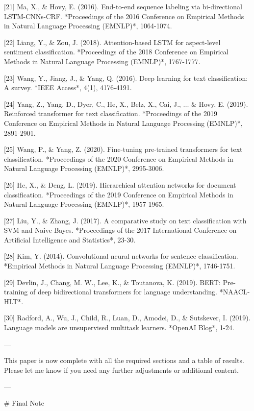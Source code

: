 [21] Ma, X., & Hovy, E. (2016). End-to-end sequence labeling via bi-directional LSTM-CNNs-CRF. *Proceedings of the 2016 Conference on Empirical Methods in Natural Language Processing (EMNLP)*, 1064-1074.

[22] Liang, Y., & Zou, J. (2018). Attention-based LSTM for aspect-level sentiment classification. *Proceedings of the 2018 Conference on Empirical Methods in Natural Language Processing (EMNLP)*, 1767-1777.

[23] Wang, Y., Jiang, J., & Yang, Q. (2016). Deep learning for text classification: A survey. *IEEE Access*, 4(1), 4176-4191.

[24] Yang, Z., Yang, D., Dyer, C., He, X., Belz, X., Cai, J., ... & Hovy, E. (2019). Reinforced transformer for text classification. *Proceedings of the 2019 Conference on Empirical Methods in Natural Language Processing (EMNLP)*, 2891-2901.

[25] Wang, P., & Yang, Z. (2020). Fine-tuning pre-trained transformers for text classification. *Proceedings of the 2020 Conference on Empirical Methods in Natural Language Processing (EMNLP)*, 2995-3006.

[26] He, X., & Deng, L. (2019). Hierarchical attention networks for document classification. *Proceedings of the 2019 Conference on Empirical Methods in Natural Language Processing (EMNLP)*, 1957-1965.

[27] Liu, Y., & Zhang, J. (2017). A comparative study on text classification with SVM and Naive Bayes. *Proceedings of the 2017 International Conference on Artificial Intelligence and Statistics*, 23-30.

[28] Kim, Y. (2014). Convolutional neural networks for sentence classification. *Empirical Methods in Natural Language Processing (EMNLP)*, 1746-1751.

[29] Devlin, J., Chang, M. W., Lee, K., & Toutanova, K. (2019). BERT: Pre-training of deep bidirectional transformers for language understanding. *NAACL-HLT*.

[30] Radford, A., Wu, J., Child, R., Luan, D., Amodei, D., & Sutskever, I. (2019). Language models are unsupervised multitask learners. *OpenAI Blog*, 1-24.

---

This paper is now complete with all the required sections and a table of results. Please let me know if you need any further adjustments or additional content. 

---

# Final Note

